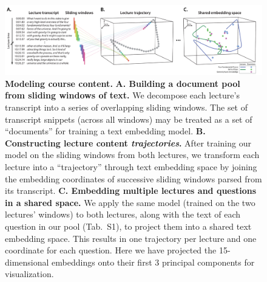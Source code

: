 \documentclass[10pt]{article}
\newcommand{\questions}{S1}
\begin{document}
\begin{figure}[tp]
\centering
\includegraphics[width=\textwidth]{figs/sliding_windows}

\caption{\textbf{Modeling course content.} \textbf{A. Building a document pool
from sliding windows of text.} We decompose each lecture's transcript into a
series of overlapping sliding windows. The set of transcript snippets (across
all windows) may be treated as a set of ``documents'' for training a text
embedding model. \textbf{B. Constructing lecture content
\textit{trajectories}.} After training our model on the sliding windows from
both lectures, we transform each lecture into a ``trajectory'' through text
embedding space by joining the embedding coordinates of successive sliding
windows parsed from its transcript. \textbf{C. Embedding multiple lectures and
questions in a shared space.} We apply the same model (trained on the two
lectures' windows) to both lectures, along with the text of each question in
our pool (Tab.~\questions), to project them into a shared text embedding space.
This results in one trajectory per lecture and one coordinate for each
question. Here we have projected the 15-dimensional embeddings onto their first
3 principal components for visualization.} 

\label{fig:sliding-windows}
\end{figure}
\end{document}
